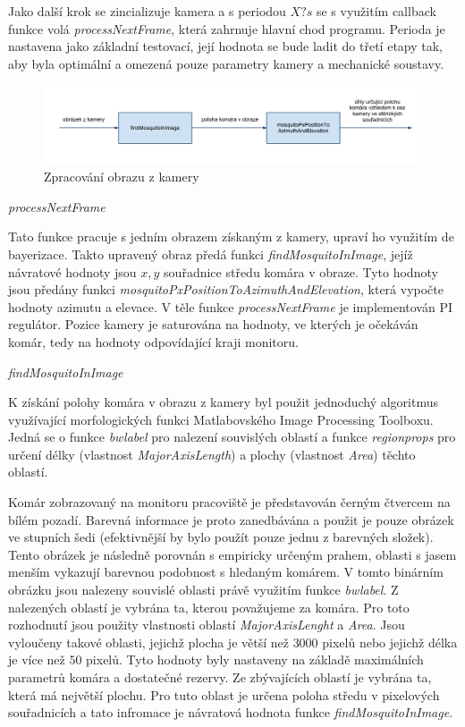\documentclass[a4paper,10pt]{article}
\begin{document}
Jako další krok se zincializuje kamera a s periodou $X? s$ se s využitím callback funkce volá \textit{processNextFrame}, která zahrnuje hlavní chod programu. Perioda je nastavena jako základní testovací, její hodnota se bude ladit do třetí etapy tak, aby byla optimální a omezená pouze parametry kamery a mechanické soustavy. 

\begin{figure}[!h]
    \centering
     \includegraphics[width=1\columnwidth]{pics/zpracovani_obrazu_z_kamery}
     \caption{Zpracování obrazu z kamery\label{fig:rid_system}}
\end{figure}


\vspace{0.5cm}
\textit{processNextFrame}

Tato funkce pracuje s jedním obrazem získaným z kamery, upraví ho využitím de bayerizace. Takto upravený obraz předá funkci \textit{findMosquitoInImage}, jejíž návratové hodnoty jsou $x, y$ souřadnice středu komára v obraze. Tyto hodnoty jsou předány funkci \textit{mosquitoPxPositionToAzimuthAndElevation}, která vypočte hodnoty azimutu a elevace. V těle funkce \textit{processNextFrame} je implementován PI regulátor. Pozice kamery je saturována na hodnoty, ve kterých je očekáván komár, tedy na hodnoty odpovídající kraji monitoru. 

\vspace{0.5cm}
\textit{findMosquitoInImage}

K získání polohy komára v obrazu z kamery byl použit jednoduchý algoritmus využívající morfologických funkci Matlabovského Image Processing Toolboxu. Jedná se o funkce \textit{bwlabel} pro nalezení souvislých oblastí a funkce \textit{regionprops} pro určení délky (vlastnost \textit{MajorAxisLength}) a plochy (vlastnost \textit{Area}) těchto oblastí.

Komár zobrazovaný na monitoru pracoviště je představován černým čtvercem na bílém pozadí. Barevná informace je proto zanedbávána a použit je pouze obrázek ve stupních šedi (efektivnější by bylo použít pouze jednu z barevných složek). Tento obrázek je následně porovnán s empiricky určeným prahem, oblasti s jasem menším vykazují barevnou podobnost s hledaným komárem. V tomto binárním obrázku jsou nalezeny souvislé oblasti právě využitím funkce \textit{bwlabel}. Z nalezených oblastí je vybrána ta, kterou považujeme za komára. Pro toto rozhodnutí jsou použity vlastnosti oblastí \textit{MajorAxisLenght} a \textit{Area}. Jsou vyloučeny takové oblasti, jejichž plocha je větší než $3000$ pixelů nebo jejichž délka je více než $50$ pixelů. Tyto hodnoty byly nastaveny na základě maximálních parametrů komára a dostatečné rezervy. Ze zbývajících oblastí je vybrána ta, která má největší plochu. Pro tuto oblast je určena poloha středu v pixelových souřadnicích a tato infromace je návratová hodnota funkce \textit{findMosquitoInImage}.
\end{document}
